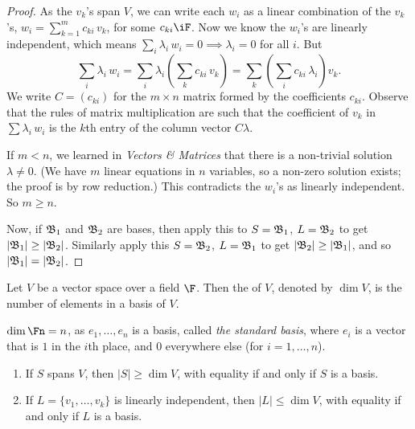 \begin{proof}
	As the $v_k$'s span $V$, we can write each $w_i$ as a linear combination of the $v_k$'s,  $w_i = \sum_{k=1}^m c_{ki}\, v_k$, for some $c_{ki}\iF$. Now we know the $w_i$'s are linearly independent, which means $\sum_i \lambda_i \,w_i = 0 \implies \lambda_i = 0$ for all $i$. But %
	\begin{equation*}
		\textstyle
		\sum_i \lambda_i\, w_i
		= \sum_i \lambda_i \left( \sum_k c_{ki}\, v_k \right)
		= \sum_k \left( \sum_i c_{ki}\,\lambda_i \right) v_k.
	\end{equation*}
	We write $C=(c_{ki})$ for the $m\times n$ matrix formed by the coefficients $c_{ki}$. 
Observe that the rules of matrix multiplication are such that the coefficient of $v_k$ in $\sum \lambda_i \, w_i$ is the $k$th entry of the column vector $C\lambda$. %
	
	If $m<n$, we learned in \emph{Vectors \& Matrices} that there is a non-trivial solution $\lambda\neq 0$. (We have $m$ linear equations in $n$ variables, so a non-zero solution exists; the proof is by row reduction.) This contradicts the $w_i$'s as linearly independent. So $m\geq n$. %
	
	Now, if $\frak{B}_1$ and $\frak{B}_2$ are bases, then apply this to $S=\frak{B}_1$, $L=\frak{B}_2$ to get $\left\vert \frak{B}_1 \right\vert\geq \left\vert \frak{B}_2 \right\vert$. Similarly apply this $S=\frak{B}_2$, $L=\frak{B}_1$ to get $\left\vert \frak{B}_2 \right\vert\geq \left\vert \frak{B}_1 \right\vert$, and so $\left\vert \frak{B}_1 \right\vert=\left\vert \frak{B}_2 \right\vert$. %
\end{proof}

\begin{definition}
	Let $V$ be a vector space over a field $\F$. Then the  of $V$, denoted by $\dim V$, is the number of elements in a basis of $V$. %
\end{definition}

\begin{example}
	$\dim \Fn=n$, as $e_1,\ldots,e_n$ is a basis, called \emph{the standard basis}, where $e_i$ is a vector that is $1$ in the $i$th place, and $0$ everywhere else (for $i=1,\ldots,n$).
\end{example}

\begin{corollary}
	\mbox{}
	\begin{enumerate}
		\shortskip
		\item If $S$ spans $V$, then $\left\vert S \right\vert\geq \dim V$, with equality if and only if $S$ is a basis. %
		\item If $L=\{v_1,\ldots,v_k\}$ is linearly independent, then $\left\vert L \right\vert\leq \dim V$, with equality if and only if $L$ is a basis. %
	\end{enumerate} %
\end{corollary}

